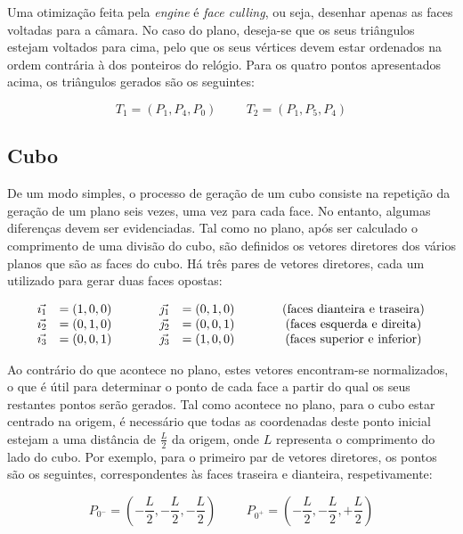 \documentclass[12pt, a4paper]{article}
\begin{document}
Uma otimização feita pela \emph{engine} é \emph{face culling}, ou seja, desenhar apenas as faces
voltadas para a câmara. No caso do plano, deseja-se que os seus triângulos estejam voltados para
cima, pelo que os seus vértices devem estar ordenados na ordem contrária à dos ponteiros do
relógio. Para os quatro pontos apresentados acima, os triângulos gerados são os seguintes:

$$
T_1 = (P_1, P_4, P_0)
\hspace{1cm}
T_2 = (P_1, P_5, P_4)
$$

\subsection{Cubo}

De um modo simples, o processo de geração de um cubo consiste na repetição da geração de um plano
seis vezes, uma vez para cada face. No entanto, algumas diferenças devem ser evidenciadas. Tal como
no plano, após ser calculado o comprimento de uma divisão do cubo, são definidos os vetores
diretores dos vários planos que são as faces do cubo. Há três pares de vetores diretores, cada um
utilizado para gerar duas faces opostas:

$$
\begin{array}{ll>{\hspace{1cm}}ll>{\hspace{1cm}}c}
    \vec{\imath_1} &= (1, 0, 0) &
    \vec{\jmath_1} &= (0, 1, 0) &
    (\text{faces dianteira e traseira}) \\
    \vec{\imath_2} &= (0, 1, 0) &
    \vec{\jmath_2} &= (0, 0, 1) &
    (\text{faces esquerda e direita}) \\
    \vec{\imath_3} &= (0, 0, 1) &
    \vec{\jmath_3} &= (1, 0, 0) &
    (\text{faces superior e inferior})
\end{array}
$$

Ao contrário do que acontece no plano, estes vetores encontram-se normalizados, o que é útil para
determinar o ponto de cada face a partir do qual os seus restantes pontos serão gerados. Tal como
acontece no plano, para o cubo estar centrado na origem, é necessário que todas as coordenadas deste
ponto inicial estejam a uma distância de $\frac{L}{2}$ da origem, onde $L$ representa o comprimento
do lado do cubo. Por exemplo, para o primeiro par de vetores diretores, os pontos são os seguintes,
correspondentes às faces traseira e dianteira, respetivamente:

$$
P_{0^-} = \left ( -\frac{L}{2}, -\frac{L}{2}, -\frac{L}{2} \right )
\hspace{1cm}
P_{0^+} = \left ( -\frac{L}{2}, -\frac{L}{2}, +\frac{L}{2} \right )
$$
\end{document}
